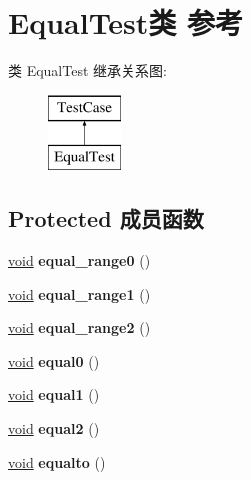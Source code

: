 \hypertarget{class_equal_test}{}\section{Equal\+Test类 参考}
\label{class_equal_test}
类 Equal\+Test 继承关系图\+:\begin{figure}[H]
\begin{center}
\leavevmode
\includegraphics[height=2.000000cm]{class_equal_test}
\end{center}
\end{figure}
\subsection*{Protected 成员函数}
\begin{DoxyCompactItemize}
\item 
\mbox{\label{class_equal_test_a20da259283c8d3f0efe00d07f506b6e5}} 
\hyperlink{interfacevoid}{void} {\bfseries equal\+\_\+range0} ()
\item 
\mbox{\label{class_equal_test_ad64fe20d66cf39ec39fcc5e4b4eac746}} 
\hyperlink{interfacevoid}{void} {\bfseries equal\+\_\+range1} ()
\item 
\mbox{\label{class_equal_test_a25c5adadf95fd200366bbf76d0fcd1db}} 
\hyperlink{interfacevoid}{void} {\bfseries equal\+\_\+range2} ()
\item 
\mbox{\label{class_equal_test_a0e587be6bfe2ca98f0d6340c3d2a51a9}} 
\hyperlink{interfacevoid}{void} {\bfseries equal0} ()
\item 
\mbox{\label{class_equal_test_acba38179aa07f29390cff2b0c59ff624}} 
\hyperlink{interfacevoid}{void} {\bfseries equal1} ()
\item 
\mbox{\label{class_equal_test_a5dffedc73429fe4f7035bc617a5bc02d}} 
\hyperlink{interfacevoid}{void} {\bfseries equal2} ()
\item 
\mbox{\label{class_equal_test_ad90a8f59e3a4a52043b23af47b07fdc8}} 
\hyperlink{interfacevoid}{void} {\bfseries equalto} ()
\end{DoxyCompactItemize}
